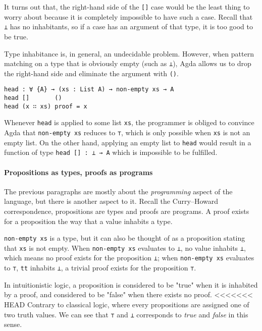 \documentclass[../thesis.tex]{subfiles}
\begin{document}
It turns out that, the right-hand side of the {\lstinline|[]|} case would be the
least thing to worry about because it is completely impossible to have such a case.
Recall that {\lstinline|⊥|} has no inhabitants, so if a case has an argument of
that type, it is too good to be true.

Type inhabitance is, in general, an undecidable problem.
However, when pattern matching on a type that is obviously empty (such as {\lstinline|⊥|}),
Agda allows us to drop the right-hand side and eliminate the argument with {\lstinline|()|}.

\begin{lstlisting}
head : ∀ {A} → (xs : List A) → non-empty xs → A
head []       ()
head (x ∷ xs) proof = x
\end{lstlisting}

Whenever {\lstinline|head|} is applied to some list {\lstinline|xs|},
the programmer is obliged to convince Agda that {\lstinline|non-empty xs|}
reduces to {\lstinline|⊤|},
which is only possible when {\lstinline|xs|} is not an empty list.
On the other hand, applying an empty list to {\lstinline|head|} would result in
a function of type {\lstinline|head [] : ⊥ → A|} which is impossible to
be fulfilled.

\paragraph{Propositions as types, proofs as programs}

The previous paragraphs are mostly about the \textit{programming}
aspect of the language, but there is another aspect to it.
Recall the Curry–Howard correspondence, propositions are types and proofs are
programs. A proof exists for a proposition the way that a value inhabits a type.

{\lstinline|non-empty xs|} is a type, but it can also be thought of as a
proposition stating that {\lstinline|xs|} is not empty.
When {\lstinline|non-empty xs|} evaluates to {\lstinline|⊥|}, no value inhabits
{\lstinline|⊥|}, which means no proof exists for the proposition {\lstinline|⊥|};
when {\lstinline|non-empty xs|} evaluates to {\lstinline|⊤|}, {\lstinline|tt|}
inhabits {\lstinline|⊥|}, a trivial proof exists for the proposition {\lstinline|⊤|}.

In intuitionistic logic, a proposition is considered to be "true" when it is
inhabited by a proof, and considered to be "false" when there exists no proof.
<<<<<<< HEAD
Contrary to classical logic, where every propositions are assigned one of two truth values.
We can see that {\lstinline|⊤|} and {\lstinline|⊥|} corresponds to \textit{true}
and \textit{false} in this sense.
\end{document}
